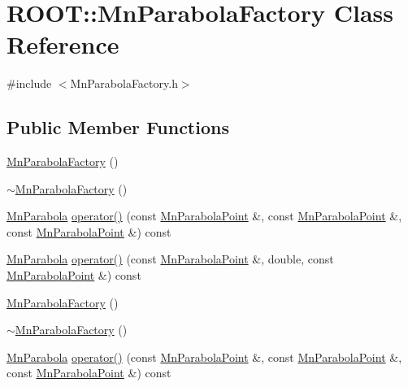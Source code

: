 \hypertarget{classROOT_1_1Minuit2_1_1MnParabolaFactory}{}\section{R\+O\+OT\+:\+:Mn\+Parabola\+Factory Class Reference}
\label{classROOT_1_1Minuit2_1_1MnParabolaFactory}


{\ttfamily \#include $<$Mn\+Parabola\+Factory.\+h$>$}

\subsection*{Public Member Functions}
\begin{DoxyCompactItemize}
\item 
\mbox{\hyperlink{classROOT_1_1Minuit2_1_1MnParabolaFactory_a6170ddac807544cd8f13dbb0b59fb568}{Mn\+Parabola\+Factory}} ()
\item 
\mbox{\hyperlink{classROOT_1_1Minuit2_1_1MnParabolaFactory_ab5b7289c1e63637bc2ecc9ac051b57a5}{$\sim$\+Mn\+Parabola\+Factory}} ()
\item 
\mbox{\hyperlink{classROOT_1_1Minuit2_1_1MnParabola}{Mn\+Parabola}} \mbox{\hyperlink{classROOT_1_1Minuit2_1_1MnParabolaFactory_aa5ff96ea03013f1dcbbac298fe26e484}{operator()}} (const \mbox{\hyperlink{classROOT_1_1Minuit2_1_1MnParabolaPoint}{Mn\+Parabola\+Point}} \&, const \mbox{\hyperlink{classROOT_1_1Minuit2_1_1MnParabolaPoint}{Mn\+Parabola\+Point}} \&, const \mbox{\hyperlink{classROOT_1_1Minuit2_1_1MnParabolaPoint}{Mn\+Parabola\+Point}} \&) const
\item 
\mbox{\hyperlink{classROOT_1_1Minuit2_1_1MnParabola}{Mn\+Parabola}} \mbox{\hyperlink{classROOT_1_1Minuit2_1_1MnParabolaFactory_ab4b6a74b071f4d780dbf6b4663c188b3}{operator()}} (const \mbox{\hyperlink{classROOT_1_1Minuit2_1_1MnParabolaPoint}{Mn\+Parabola\+Point}} \&, double, const \mbox{\hyperlink{classROOT_1_1Minuit2_1_1MnParabolaPoint}{Mn\+Parabola\+Point}} \&) const
\item 
\mbox{\hyperlink{classROOT_1_1Minuit2_1_1MnParabolaFactory_a6170ddac807544cd8f13dbb0b59fb568}{Mn\+Parabola\+Factory}} ()
\item 
\mbox{\hyperlink{classROOT_1_1Minuit2_1_1MnParabolaFactory_ab5b7289c1e63637bc2ecc9ac051b57a5}{$\sim$\+Mn\+Parabola\+Factory}} ()
\item 
\mbox{\hyperlink{classROOT_1_1Minuit2_1_1MnParabola}{Mn\+Parabola}} \mbox{\hyperlink{classROOT_1_1Minuit2_1_1MnParabolaFactory_aa5ff96ea03013f1dcbbac298fe26e484}{operator()}} (const \mbox{\hyperlink{classROOT_1_1Minuit2_1_1MnParabolaPoint}{Mn\+Parabola\+Point}} \&, const \mbox{\hyperlink{classROOT_1_1Minuit2_1_1MnParabolaPoint}{Mn\+Parabola\+Point}} \&, const \mbox{\hyperlink{classROOT_1_1Minuit2_1_1MnParabolaPoint}{Mn\+Parabola\+Point}} \&) const

\end{DoxyCompactItemize}
